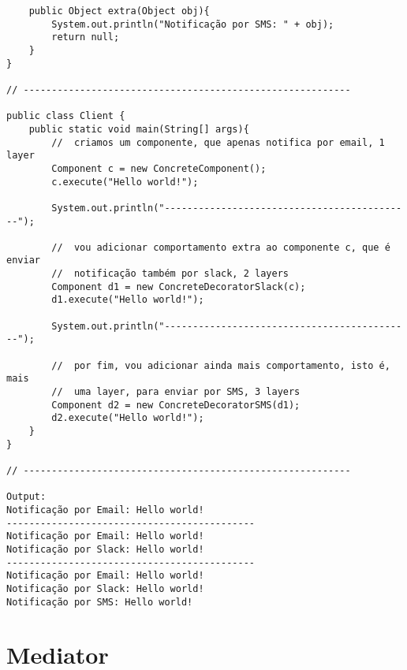 \begin{verbatim}
    public Object extra(Object obj){
        System.out.println("Notificação por SMS: " + obj);
        return null;
    }
}

// ----------------------------------------------------------

public class Client {
    public static void main(String[] args){
        //  criamos um componente, que apenas notifica por email, 1 layer
        Component c = new ConcreteComponent();
        c.execute("Hello world!");

        System.out.println("--------------------------------------------");

        //  vou adicionar comportamento extra ao componente c, que é enviar 
        //  notificação também por slack, 2 layers
        Component d1 = new ConcreteDecoratorSlack(c);
        d1.execute("Hello world!");

        System.out.println("--------------------------------------------");

        //  por fim, vou adicionar ainda mais comportamento, isto é, mais 
        //  uma layer, para enviar por SMS, 3 layers
        Component d2 = new ConcreteDecoratorSMS(d1);
        d2.execute("Hello world!");
    }
}

// ----------------------------------------------------------

Output:
Notificação por Email: Hello world!
--------------------------------------------
Notificação por Email: Hello world!
Notificação por Slack: Hello world!
--------------------------------------------
Notificação por Email: Hello world!
Notificação por Slack: Hello world!
Notificação por SMS: Hello world!

\end{verbatim}

\newpage

\section{Mediator}
\label{anexo:mediator}

